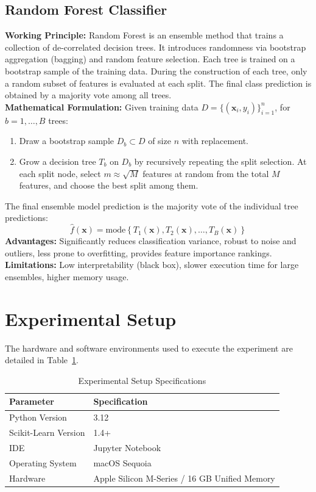 \documentclass[12pt,a4paper]{article}
\begin{document}
\subsection{Random Forest Classifier}
\textbf{Working Principle:} Random Forest is an ensemble method that trains a collection of de-correlated decision trees. It introduces randomness via bootstrap aggregation (bagging) and random feature selection. Each tree is trained on a bootstrap sample of the training data. During the construction of each tree, only a random subset of features is evaluated at each split. The final class prediction is obtained by a majority vote among all trees.\\
\textbf{Mathematical Formulation:}
Given training data $D = \{(\mathbf{x}_i, y_i)\}_{i=1}^n$, for $b = 1, \dots, B$ trees:
\begin{enumerate}
    \item Draw a bootstrap sample $D_b \subset D$ of size $n$ with replacement.
    \item Grow a decision tree $T_b$ on $D_b$ by recursively repeating the split selection. At each split node, select $m \approx \sqrt{M}$ features at random from the total $M$ features, and choose the best split among them.
\end{enumerate}
The final ensemble model prediction is the majority vote of the individual tree predictions:
\begin{equation}
    \hat{f}(\mathbf{x}) = \text{mode}\left\{ T_1(\mathbf{x}), T_2(\mathbf{x}), \dots, T_B(\mathbf{x}) \right\}
\end{equation}
\textbf{Advantages:} Significantly reduces classification variance, robust to noise and outliers, less prone to overfitting, provides feature importance rankings.\\
\textbf{Limitations:} Low interpretability (black box), slower execution time for large ensembles, higher memory usage.

\section{Experimental Setup}
The hardware and software environments used to execute the experiment are detailed in Table~\ref{tab:exp_setup}.

\begin{table}[H]
\centering
\caption{Experimental Setup Specifications}
\label{tab:exp_setup}
\vspace{0.2cm}
\begin{tabular}{ll}
\toprule
\textbf{Parameter} & \textbf{Specification} \\
\midrule
Python Version & 3.12 \\
Scikit-Learn Version & 1.4+ \\
IDE & Jupyter Notebook \\
Operating System & macOS Sequoia \\
Hardware & Apple Silicon M-Series / 16 GB Unified Memory \\
\bottomrule
\end{tabular}
\end{table}
\end{document}
